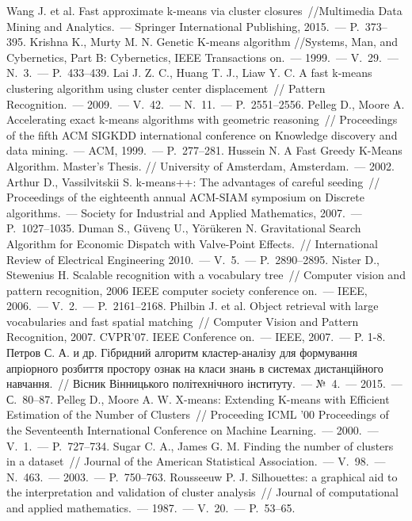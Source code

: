 \begin{thebibliography}{99}
     Wang J. et al. Fast approximate k-means via cluster closures~//Multimedia Data Mining and Analytics.~--- Springer International Publishing, 2015.~--- P.~373--395.
     Krishna K., Murty M. N. Genetic K-means algorithm //Systems, Man, and Cybernetics, Part B: Cybernetics, IEEE Transactions on.~--- 1999.~--- V.~29.~--- N.~3.~--- P.~433--439.
     Lai J. Z. C., Huang T. J., Liaw Y. C. A fast k-means clustering algorithm using cluster center displacement~// Pattern Recognition.~--- 2009.~--- V.~42.~--- N.~11.~--- P.~2551--2556.
     Pelleg D., Moore A. Accelerating exact k-means algorithms with geometric reasoning~// Proceedings of the fifth ACM SIGKDD international conference on Knowledge discovery and data mining.~--- ACM, 1999.~--- P.~277--281.
     Hussein N. A Fast Greedy K-Means Algorithm. Master's Thesis. // University of Amsterdam, Amsterdam.~--- 2002.
     Arthur D., Vassilvitskii S. k-means++: The advantages of careful seeding~// Proceedings of the eighteenth annual ACM-SIAM symposium on Discrete algorithms.~--- Society for Industrial and Applied Mathematics, 2007.~--- P.~1027--1035.
     Duman S., G\"{u}ven\c{c} U., Y\"{o}r\"{u}keren N. Gravitational Search Algorithm for Economic Dispatch with Valve-Point Effects.~// International Review of Electrical Engineering 2010.~--- V.~5.~--- P.~2890--2895.
     Nister D., Stewenius H. Scalable recognition with a vocabulary tree~// Computer vision and pattern recognition, 2006 IEEE computer society conference on.~--- IEEE, 2006.~--- V.~2.~--- P.~2161--2168.
     Philbin J. et al. Object retrieval with large vocabularies and fast spatial matching~// Computer Vision and Pattern Recognition, 2007. CVPR'07. IEEE Conference on.~--- IEEE, 2007.~--- P. 1-8.
     Петров С. А. и др. Гібридний алгоритм кластер-аналізу для формування апріорного розбиття простору ознак на класи знань в системах дистанційного навчання.~// Вісник Вінницького політехнічного інституту.~--- №~4.~--- 2015.~--- С.~80--87.
     Pelleg D., Moore A. W. X-means: Extending K-means with Efficient Estimation of the Number of Clusters~// Proceeding ICML '00 Proceedings of the Seventeenth International Conference on Machine Learning.~--- 2000.~--- V.~1.~--- P.~727--734.
     Sugar C. A., James G. M. Finding the number of clusters in a dataset~// Journal of the American Statistical Association.~--- V.~98.~--- N.~463.~--- 2003.~--- P.~750--763.
     Rousseeuw P. J. Silhouettes: a graphical aid to the interpretation and validation of cluster analysis~// Journal of computational and applied mathematics.~--- 1987.~--- V.~20.~--- P.~53--65.

\end{thebibliography}
